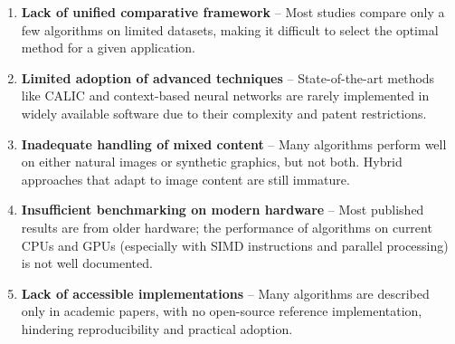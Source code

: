 \begin{enumerate}
    \item \textbf{Lack of unified comparative framework} – Most studies compare only a few algorithms on limited datasets, making it difficult to select the optimal method for a given application.
    
    \item \textbf{Limited adoption of advanced techniques} – State-of-the-art methods like CALIC and context-based neural networks are rarely implemented in widely available software due to their complexity and patent restrictions.
    
    \item \textbf{Inadequate handling of mixed content} – Many algorithms perform well on either natural images or synthetic graphics, but not both. Hybrid approaches that adapt to image content are still immature.
    
    \item \textbf{Insufficient benchmarking on modern hardware} – Most published results are from older hardware; the performance of algorithms on current CPUs and GPUs (especially with SIMD instructions and parallel processing) is not well documented.
    
    \item \textbf{Lack of accessible implementations} – Many algorithms are described only in academic papers, with no open-source reference implementation, hindering reproducibility and practical adoption.
\end{enumerate}
